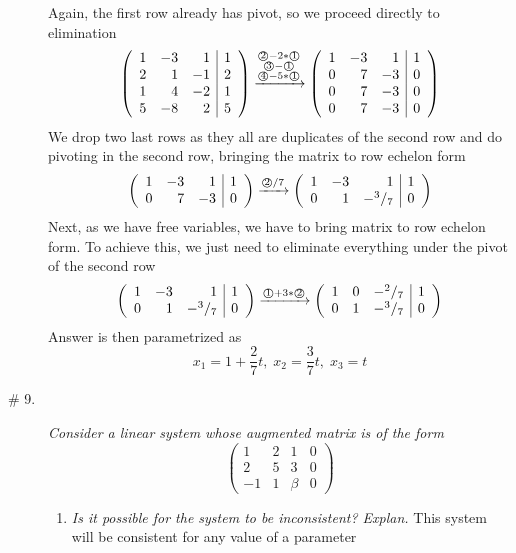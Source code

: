 \documentclass[8pt]{article} %
\newcommand{\myexplain}[3]{#1\xrightarrow{\text{#2}}#3}
\newcommand{\myexplainfi}[5]{#1\xrightarrow{\begin{subarray}{c}\text{#2}\\\text{#3}\\\text{#4}\end{subarray}}#5}
\newcommand{\myfrac}[2]{^#1/_#2}
\begin{document}
\begin{description}
{\begin{enumerate}[label=(\alph*)]
{\[		\]
	Again, the first row already has pivot, so we proceed directly to elimination
	\[\myexplainfi
		{\left(\begin{array}{rrr|r}1&-3&1&1\\2&1&-1&2\\1&4&-2&1\\5&-8&2&5\end{array}\right)}
		{\textcircled{2}$-2*$\textcircled{1}}
		{\textcircled{3}$-$\textcircled{1}}
		{\textcircled{4}$-5*$\textcircled{1}}
		{\left(\begin{array}{rrr|r}1&-3&1&1\\0&7&-3&0\\0&7&-3&0\\0&7&-3&0\end{array}\right)}
	\]
	We drop two last rows as they all are duplicates of the second row and do pivoting in the second row,
	bringing the matrix to row echelon form
	\[\myexplain
		{\left(\begin{array}{rrr|r}1&-3&1&1\\0&7&-3&0\end{array}\right)}
		{\textcircled{2}$/7$}
		{\left(\begin{array}{rrr|r}1&-3&1&1\\0&1&-\myfrac{3}{7}&0\end{array}\right)}
	\]
	Next, as we have free variables, we have to bring matrix to row echelon form. To achieve this, we just need to eliminate everything under
	the pivot of the second row
	\[\myexplain
		{\left(\begin{array}{rrr|r}1&-3&1&1\\0&1&-\myfrac{3}{7}&0\end{array}\right)}
		{\textcircled{1}$+3*$\textcircled{2}}
		{\left(\begin{array}{rrr|r}1&0&-\myfrac{2}{7}&1\\0&1&-\myfrac{3}{7}&0\end{array}\right)}
	\]
	Answer is then parametrized as \[x_1=1+\frac{2}{7}t,\;x_2=\frac{3}{7}t,\;x_3=t\]
	}
	\end{enumerate}
	}
\item[\# 9.]{{\it Consider a linear system whose augmented matrix is of the form}
	\[{\left(\begin{array}{rrr|r}1&2&1&0\\2&5&3&0\\-1&1&\beta&0\end{array}\right)}\]
	\begin{enumerate}[label=(\alph*)]
		\item{{\it Is it possible for the system to be inconsistent? Explan.} This system will be consistent for any value of a parameter
}
\end{enumerate}}
\end{description}
\end{document}
